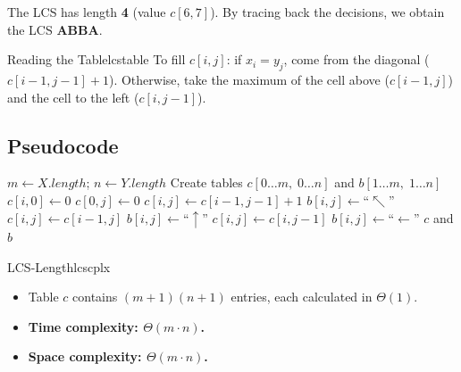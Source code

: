 The LCS has length \textbf{4} (value $c[6,7]$). By tracing back the decisions, we
obtain the LCS \textbf{ABBA}.

\begin{remark}{Reading the Table}{lcstable}
To fill $c[i,j]$: if $x_i = y_j$, come from the diagonal ($c[i-1,j-1]+1$).
Otherwise, take the maximum of the cell above ($c[i-1,j]$) and the cell
to the left ($c[i,j-1]$).
\end{remark}

\subsection{Pseudocode}

\begin{algorithm}[H]
\caption{LCS-Length($X$, $Y$)}
\begin{algorithmic}[1]
\State $m \leftarrow X.\mathit{length}$;\; $n \leftarrow Y.\mathit{length}$
\State Create tables $c[0\ldots m,\; 0\ldots n]$ and $b[1\ldots m,\; 1\ldots n]$
    \State $c[i, 0] \leftarrow 0$
\EndFor
{}
    \State $c[0, j] \leftarrow 0$
\EndFor
{}
            \State $c[i, j] \leftarrow c[i-1, j-1] + 1$
            \State $b[i, j] \leftarrow \text{``}\nwarrow\text{''}$   
            \State $c[i, j] \leftarrow c[i-1, j]$
            \State $b[i, j] \leftarrow \text{``}\uparrow\text{''}$   
        \Else
            \State $c[i, j] \leftarrow c[i, j-1]$
            \State $b[i, j] \leftarrow \text{``}\leftarrow\text{''}$ 
        \EndIf
    \EndFor
\EndFor
\State \Return $c$ and $b$
\end{algorithmic}
\end{algorithm}

\begin{complexity}{LCS-Length}{lcscplx}
\begin{itemize}[noitemsep]
  \item Table $c$ contains $(m+1)(n+1)$ entries, each calculated in $\Theta(1)$.
  \item \textbf{Time complexity: $\Theta(m \cdot n)$.}
  \item \textbf{Space complexity: $\Theta(m \cdot n)$.}
\end{itemize}
\end{complexity}

